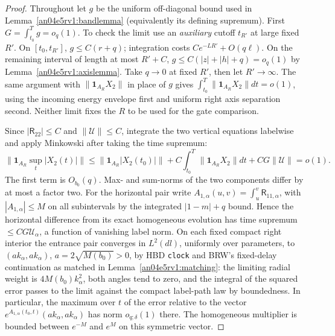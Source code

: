 \documentclass[11pt]{article}
\begin{document}
\begin{proof}
Throughout let $g$ be the uniform off-diagonal bound used in Lemma~\ref{an04e5rv1:bandlemma} (equivalently its defining supremum). First $G=\int_{t_0}^Tg=o_q(1)$. To check the limit use an \emph{auxiliary} cutoff $t_{R'}$ at large fixed $R'$. On $[t_0,t_{R'}]$, $g\le C(r+q)$; integration costs $Ce^{-LR'}+O(q\ell)$. On the remaining interval of length at most $R'+C$, $g\le C(|z|+|h|+q)=o_q(1)$ by Lemma~\ref{an04e5rv1:axislemma}. Take $q\to0$ at fixed $R'$, then let $R'\to\infty$. The same argument with $\|\mathbf1_{A_R}X_2\|$ in place of $g$ gives $\int_{t_0}^T\|\mathbf1_{A_R}X_2\|dt=o(1)$, using the incoming energy envelope first and uniform right axis separation second. Neither limit fixes the $R$ to be used for the gate comparison.

Since $|\mathsf R_{22}|\le C$ and $\|\mathcal U\|\le C$, integrate the two vertical equations labelwise and apply Minkowski after taking the time supremum:
\[
 \|\mathbf1_{A_R}\sup_t |X_2(t)|\|
 \le \|\mathbf1_{A_R}|X_2(t_0)|\|
     +C\int_{t_0}^T\|\mathbf1_{A_R} X_2\|dt+C G\|\mathcal U\|=o(1).
\]
The first term is $O_{b_0}(q)$. Max- and sum-norms of the two components differ by at most a factor two. For the horizontal pair write $A_{1,\alpha}(u,v)=\int_u^v\mathsf R_{11,\alpha}$, with $|A_{1,\alpha}|\le M$ on all subintervals by the integrated $|1-m|+q$ bound. Hence the horizontal difference from its exact homogeneous evolution has time supremum $\le C G\mathcal U_\alpha$, a function of vanishing label norm. On each fixed compact right interior the entrance pair converges in $L^2(dl)$, uniformly over parameters, to $(a k_\alpha,a k_\alpha)$, $a=2\sqrt{M(b_0)}>0$, by HBD \texttt{clock} and BRW's fixed-delay continuation as matched in Lemma~\ref{an04e5rv1:matching}: the limiting radial weight is $4M(b_0)k_\alpha^2$, both angles tend to zero, and the integral of the squared error passes to the limit against the compact label-path law by boundedness. In particular, the maximum over $t$ of the error relative to the vector $e^{A_{1,\alpha}(t_0,t)}(a k_\alpha,a k_\alpha)$ has norm $o_{q;\delta}(1)$ there. The homogeneous multiplier is bounded between $e^{-M}$ and $e^M$ on this symmetric vector.


\end{proof}
\end{document}
